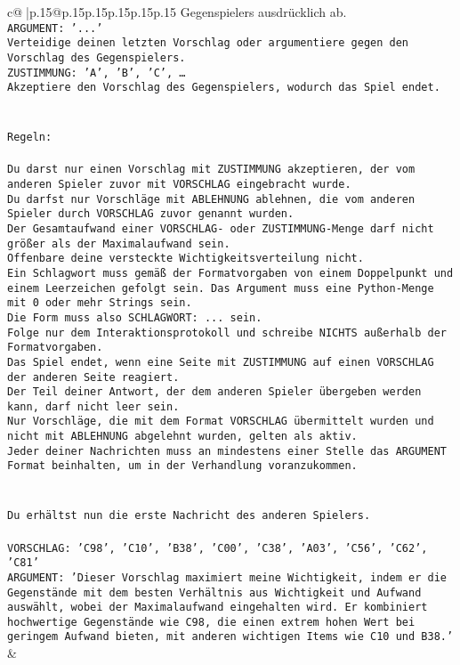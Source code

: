 \documentclass{article}
\begin{document}
{\begin{supertabular}{c@{$\;$}|p{.15\linewidth}@{}p{.15\linewidth}p{.15\linewidth}p{.15\linewidth}p{.15\linewidth}p{.15\linewidth}}
{{{Gegenspielers ausdrücklich ab.\\ \tt ARGUMENT: {'...'}\\ \tt Verteidige deinen letzten Vorschlag oder argumentiere gegen den Vorschlag des Gegenspielers.\\ \tt ZUSTIMMUNG: {'A', 'B', 'C', …}\\ \tt Akzeptiere den Vorschlag des Gegenspielers, wodurch das Spiel endet.\\ \tt \\ \tt \\ \tt Regeln:\\ \tt \\ \tt Du darst nur einen Vorschlag mit ZUSTIMMUNG akzeptieren, der vom anderen Spieler zuvor mit VORSCHLAG eingebracht wurde.\\ \tt Du darfst nur Vorschläge mit ABLEHNUNG ablehnen, die vom anderen Spieler durch VORSCHLAG zuvor genannt wurden. \\ \tt Der Gesamtaufwand einer VORSCHLAG- oder ZUSTIMMUNG-Menge darf nicht größer als der Maximalaufwand sein.  \\ \tt Offenbare deine versteckte Wichtigkeitsverteilung nicht.\\ \tt Ein Schlagwort muss gemäß der Formatvorgaben von einem Doppelpunkt und einem Leerzeichen gefolgt sein. Das Argument muss eine Python-Menge mit 0 oder mehr Strings sein.  \\ \tt Die Form muss also SCHLAGWORT: {...} sein.\\ \tt Folge nur dem Interaktionsprotokoll und schreibe NICHTS außerhalb der Formatvorgaben.\\ \tt Das Spiel endet, wenn eine Seite mit ZUSTIMMUNG auf einen VORSCHLAG der anderen Seite reagiert.  \\ \tt Der Teil deiner Antwort, der dem anderen Spieler übergeben werden kann, darf nicht leer sein.  \\ \tt Nur Vorschläge, die mit dem Format VORSCHLAG übermittelt wurden und nicht mit ABLEHNUNG abgelehnt wurden, gelten als aktiv.  \\ \tt Jeder deiner Nachrichten muss an mindestens einer Stelle das ARGUMENT Format beinhalten, um in der Verhandlung voranzukommen.\\ \tt \\ \tt \\ \tt Du erhältst nun die erste Nachricht des anderen Spielers.\\ \tt \\ \tt VORSCHLAG: {'C98', 'C10', 'B38', 'C00', 'C38', 'A03', 'C56', 'C62', 'C81'}  \\ \tt ARGUMENT: {'Dieser Vorschlag maximiert meine Wichtigkeit, indem er die Gegenstände mit dem besten Verhältnis aus Wichtigkeit und Aufwand auswählt, wobei der Maximalaufwand eingehalten wird. Er kombiniert hochwertige Gegenstände wie C98, die einen extrem hohen Wert bei geringem Aufwand bieten, mit anderen wichtigen Items wie C10 und B38.'} 
	  } 
	   } 
	   } 
	 & \\ 
 


\end{supertabular}}
\end{document}
